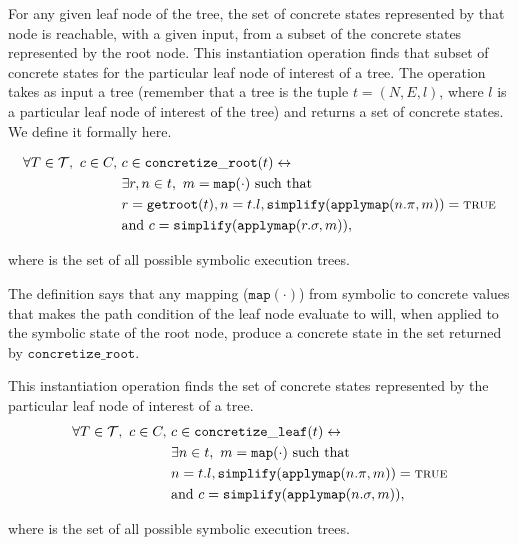 \begin{mydefinition}
  \label{def:concroot}
  
  For any given leaf node of the
  tree, the set of concrete states represented by that node is reachable, with a
  given input, from a subset of the concrete states represented by the root
  node. This instantiation operation finds that subset of concrete states
  for the particular leaf node of interest of a tree. The operation takes as
  input a tree (remember that a tree is
  the tuple $t = (N, E, l)$, where $l$ is a particular leaf node of interest of
  the tree) and returns
  a set of concrete states. We define it formally here.

  \begin{align*}
\forall T \in \mathcal{T},~ c \in C,~& c \in
\mathtt{concretize\_root}(t) \leftrightarrow \\
&\exists r,n \in t,~ m = \mathtt{map(\cdot)} \mathrm{~such~that}\\
&r = \mathtt{getroot}(t), n = t.l,
\mathtt{simplify}(\mathtt{applymap} (n.\pi, m)) = \mathtt{\textsc{true}} \\
&\mathrm{and~}  c = \mathtt{simplify}(\mathtt{applymap}(r.\sigma, m)),
    \end{align*}
\end{mydefinition}
where \trees{} is the set of all possible symbolic execution trees.

The definition says that any mapping ($\mathtt{map(\cdot)}$) from symbolic to concrete values that makes
the path condition of the leaf node evaluate to \texttrue{} will, when applied to
the symbolic state of the root node, produce a concrete state in the set returned
by $\mathtt{concretize\_root}$.

\begin{mydefinition}
  \label{def:concleaf}

  This instantiation operation finds the set of concrete states represented by
  the particular leaf node of interest of a tree.
  \begin{align*}
\forall T \in \mathcal{T},~ c \in C,~& c \in
\mathtt{concretize\_leaf}(t) \leftrightarrow \\
&\exists n \in t,~ m = \mathtt{map(\cdot)} \mathrm{~such~that}\\
&n = t.l,
\mathtt{simplify}(\mathtt{applymap} (n.\pi, m)) = \mathtt{\textsc{true}} \\
&\mathrm{and~}  c = \mathtt{simplify}(\mathtt{applymap}(n.\sigma, m)),
    \end{align*}
\end{mydefinition}
where \trees{} is the set of all possible symbolic execution trees.

